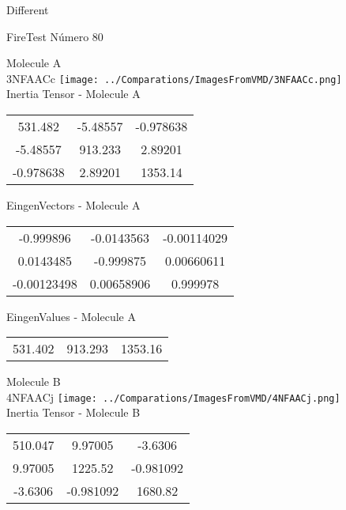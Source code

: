 \begin{center}
\vtab
\vtab
\textcolor{NavyBlue}{\Large Different}
\end{center}

 \newpage

\vtab[-2cm]
\begin{center}
{\large FireTest \tab Número 80}
\end{center}
\begin{multicols}{2}
\begin{center}

Molecule A \\ 
3NFAACc
\texttt{[image: ../Comparations/ImagesFromVMD/3NFAACc.png]}
\\
Inertia Tensor - Molecule A \\
\vtab

\begin{tabular}{|c c c|}
531.482	 & 	-5.48557	 & 	-0.978638	 \\
-5.48557	 & 	913.233	 & 	2.89201	 \\
-0.978638	 & 	2.89201	 & 	1353.14
\end{tabular}

\vtab
 EingenVectors - Molecule A     \\
\vtab
\begin{tabular}{|c c c|}
-0.999896	 & 	-0.0143563	 & 	-0.00114029	 \\
0.0143485	 & 	-0.999875	 & 	0.00660611	 \\
-0.00123498	 & 	0.00658906	 & 	0.999978
\end{tabular}

\vtab
 EingenValues - Molecule A     \\
\vtab
\begin{tabular}{|c c c|}
531.402	 & 	913.293	 & 	1353.16	 \\
\end{tabular}
\columnbreak

Molecule B \\ 
4NFAACj
\texttt{[image: ../Comparations/ImagesFromVMD/4NFAACj.png]}
\\
Inertia Tensor - Molecule B \\
\vtab

\begin{tabular}{|c c c|}
510.047	 & 	9.97005	 & 	-3.6306	 \\
9.97005	 & 	1225.52	 & 	-0.981092	 \\
-3.6306	 & 	-0.981092	 & 	1680.82
\end{tabular}


\end{center}
\end{multicols}
